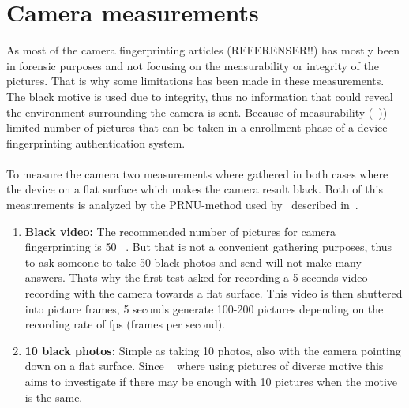 \section{Camera measurements}\label{sec:measurement:camera}
As most of the camera fingerprinting articles (REFERENSER!!) has mostly been in forensic purposes and not focusing on the measurability or integrity of the pictures. That is why some limitations has been made in these measurements. The black motive is used due to integrity, thus no information that could reveal the environment surrounding the camera is sent. Because of measurability (~)) limited number of pictures that can be taken in a enrollment phase of a device fingerprinting authentication system.\\
\\
To measure the camera two measurements where gathered in both cases where the device on a flat surface which makes the camera result black. Both of this measurements is analyzed by the PRNU-method used by~\cite{sensor:camera:DCIdent} described in~.
\begin{enumerate}
  \item \textbf{Black video:} The recommended number of pictures for camera fingerprinting is 50 ~\cite[]{sensor:camera:DCIdent}. But that is not a convenient gathering purposes, thus to ask someone to take 50 black photos and send will not make many answers. Thats why the first test asked for recording a 5 seconds video-recording with the camera towards a flat surface. This video is then shuttered into picture frames, 5 seconds generate 100-200 pictures depending on the recording rate of fps (frames per second).
  \item \textbf{10 black photos:} Simple as taking 10 photos, also with the camera pointing down on a flat surface. Since ~\cite{sensor:camera:DCIdent} where using pictures of diverse motive this aims to investigate if there may be enough with 10 pictures when the motive is the same.
\end{enumerate}

